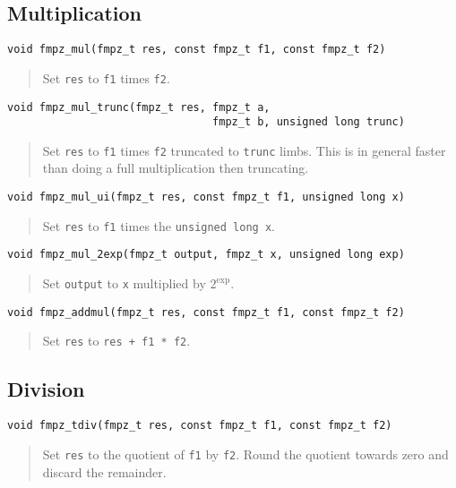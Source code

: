 \documentclass[a4paper,10pt]{article}
\newcommand{\code}{\lstinline}
\begin{document}
\subsection{Multiplication}

\begin{lstlisting}
void fmpz_mul(fmpz_t res, const fmpz_t f1, const fmpz_t f2)
\end{lstlisting}
\begin{quote}
Set \code{res} to \code{f1} times \code{f2}.
\end{quote}

\begin{lstlisting}
void fmpz_mul_trunc(fmpz_t res, fmpz_t a, 
                                fmpz_t b, unsigned long trunc) 
\end{lstlisting}
\begin{quote}
Set \code{res} to \code{f1} times \code{f2} truncated to \code{trunc} limbs. This is in general faster than doing a full multiplication then truncating.
\end{quote}

\begin{lstlisting}
void fmpz_mul_ui(fmpz_t res, const fmpz_t f1, unsigned long x)
\end{lstlisting}
\begin{quote}
Set \code{res} to \code{f1} times the \code{unsigned long x}.
\end{quote}

\begin{lstlisting}
void fmpz_mul_2exp(fmpz_t output, fmpz_t x, unsigned long exp)
\end{lstlisting}
\begin{quote}
Set \code{output} to \code{x} multiplied by $2^{\mbox{exp}}$.
\end{quote}

\begin{lstlisting}
void fmpz_addmul(fmpz_t res, const fmpz_t f1, const fmpz_t f2)
\end{lstlisting}
\begin{quote}
Set \code{res} to \code{res + f1 * f2}.
\end{quote}

\subsection{Division}

\begin{lstlisting}
void fmpz_tdiv(fmpz_t res, const fmpz_t f1, const fmpz_t f2)
\end{lstlisting}
\begin{quote}
Set \code{res} to the quotient of \code{f1} by \code{f2}. Round the quotient towards zero and discard the remainder.
\end{quote}
\end{document}
